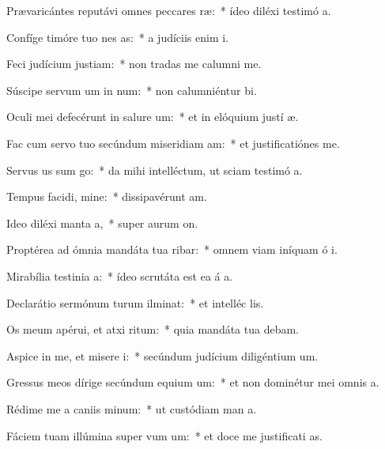 \item Prævaricántes reputávi omnes peccares ræ:~* ídeo diléxi testimó a.
\item Confíge timóre tuo nes as:~* a judíciis enim  i.
\item Feci judícium  justiam:~* non tradas me calumni me.
\item Súscipe servum um in num:~* non calumniéntur  bi.
\item Oculi mei defecérunt in salure um:~* et in elóquium justí æ.
\item Fac cum servo tuo secúndum miseridiam am:~* et justificatiónes   me.
\item Servus us sum go:~* da mihi intelléctum, ut sciam testimó a.
\item Tempus facidi, mine:~* dissipavérunt  am.
\item Ideo diléxi manta a,~* super aurum  on.
\item Proptérea ad ómnia mandáta tua ribar:~* omnem viam iníquam ó i.
\item Mirabília testinia a:~* ídeo scrutáta est ea á a.
\item Declarátio sermónum turum ilminat:~* et intelléc  lis.
\item Os meum apérui, et atxi ritum:~* quia mandáta tua debam.
\item Aspice in me, et misere i:~* secúndum judícium diligéntium  um.
\item Gressus meos dírige secúndum equium um:~* et non dominétur mei omnis a.
\item Rédime me a caniis minum:~* ut custódiam man a.
\item Fáciem tuam illúmina super vum um:~* et doce me justificati as.

